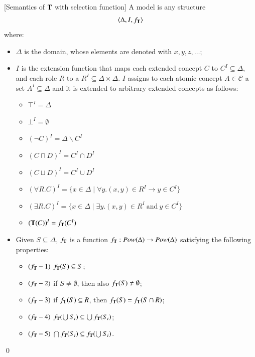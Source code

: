 \documentclass[a4paper, 11pt, oneside]{elsarticle}
\newcommand{\tip}{{\bf T}}
\newcommand{\vuoto} {\emptyset}
\newcommand{\nott} {\lnot}
\newcommand{\tc} {\mid}
\newcommand{\imp} {\rightarrow}
\newenvironment{definition}
{\begin{defi} \rm}{\qed \end{defi}}
\newcounter{posu}
\newtheorem{definition}[posu]{Definition}
\begin{document}
\begin{definition}[Semantics of $\tip$ with selection function]\label{Semantics
with f_tip} A model is any structure $$\langle \Delta, I, f_\tip \rangle$$
where:

\begin{itemize}
\item $\Delta$ is the domain, whose elements are denoted with $x, y, z, \dots$;
\item $I$ is the extension function that
maps each extended concept $C$
to $C^I \subseteq \Delta$, and each role $R$ to a $R^I \subseteq
\Delta \times \Delta$. $I$ assigns to each atomic concept $A \in
\mathcal{C}$ a set $A^I \subseteq \Delta$ and it is extended to
arbitrary extended concepts as follows:

\begin{itemize}
  \item $\top^I=\Delta$
  \item $\bot^I=\vuoto$
  \item $(\nott C)^I=\Delta \backslash C^I$
  \item $(C \sqcap D)^I=C^I \cap D^I$
  \item $(C \sqcup D)^I=C^I \cup D^I$
  \item $(\forall R.C)^I=\{x \in \Delta \tc \forall y. (x,y) \in R^I \imp y \in C^I\}$
  \item $(\exists R.C)^I=\{x \in \Delta \tc \exists y.(x,y) \in R^I \ \mbox{and} \ y \in C^I\}$
  \item $(\tip(C))^I = f_\tip(C^I)$
\end{itemize}


\item Given $S \subseteq \Delta$, $f_\tip$ is a function $f_\tip : Pow(\Delta) \rightarrow Pow(\Delta)$
satisfying the
following properties:

\begin{itemize}
\item $(f_\tip-1)$ $f_\tip(S) \subseteq S$;
\item $(f_\tip-2)$ if $S \neq \emptyset$, then also $f_\tip(S)
\neq \emptyset$;
\item $(f_\tip-3)$ if $f_\tip(S) \subseteq R$, then $f_\tip(S) = f_\tip(S \cap R)$;
 \item $(f_\tip-4)$ $f_\tip(\bigcup S_i ) \subseteq \bigcup f_\tip(S_i)$;
\item $(f_\tip-5)$ $\bigcap f_\tip(S_i) \subseteq  f_\tip(\bigcup S_i)$.
\end{itemize}

\end{itemize}

\end{definition}
\end{document}
